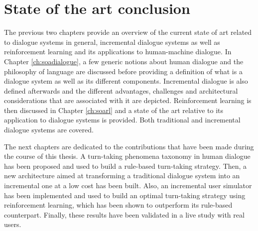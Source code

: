 \chapter*{State of the art conclusion}

     The previous two chapters provide an overview of the current state of art related to dialogue systems in general, incremental dialogue systems as well as reinforcement learning and its applications to human-machine dialogue. In Chapter \ref{ch:soadialogue}, a few generic notions about human dialogue and the philosophy of language are discussed before providing a definition of what is a dialogue system as well as its different components. Incremental dialogue is also defined afterwards and the different advantages, challenges and architectural considerations that are associated with it are depicted. Reinforcement learning is then discussed in Chapter \ref{ch:soarl} and a state of the art relative to its application to dialogue systems is provided. Both traditional and incremental dialogue systems are covered.

     The next chapters are dedicated to the contributions that have been made during the course of this thesis. A turn-taking phenomena taxonomy in human dialogue has been proposed and used to build a rule-based turn-taking strategy. Then, a new architecture aimed at transforming a traditional dialogue system into an incremental one at a low cost has been built. Also, an incremental user simulator has been implemented and used to build an optimal turn-taking strategy using reinforcement learning, which has been shown to outperform its rule-based counterpart. Finally, these results have been validated in a live study with real users.